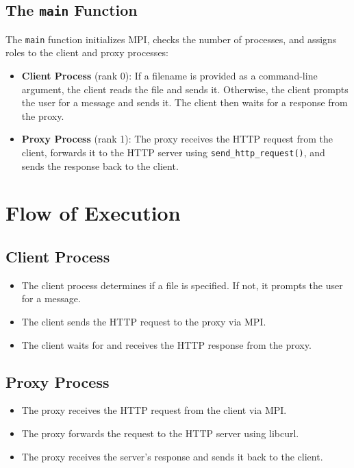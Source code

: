 \documentclass[a4paper,12pt]{article}
\begin{document}
\subsection{The \texttt{main} Function}
The \texttt{main} function initializes MPI, checks the number of processes, and assigns roles to the client and proxy processes:
\begin{itemize}
    \item \textbf{Client Process} (rank 0): If a filename is provided as a command-line argument, the client reads the file and sends it. Otherwise, the client prompts the user for a message and sends it. The client then waits for a response from the proxy.
    \item \textbf{Proxy Process} (rank 1): The proxy receives the HTTP request from the client, forwards it to the HTTP server using \texttt{send\_http\_request()}, and sends the response back to the client.
\end{itemize}

\section{Flow of Execution}
\subsection{Client Process}
\begin{itemize}
    \item The client process determines if a file is specified. If not, it prompts the user for a message.
    \item The client sends the HTTP request to the proxy via MPI.
    \item The client waits for and receives the HTTP response from the proxy.
\end{itemize}

\subsection{Proxy Process}
\begin{itemize}
    \item The proxy receives the HTTP request from the client via MPI.
    \item The proxy forwards the request to the HTTP server using libcurl.
    \item The proxy receives the server's response and sends it back to the client.
\end{itemize}
\end{document}

